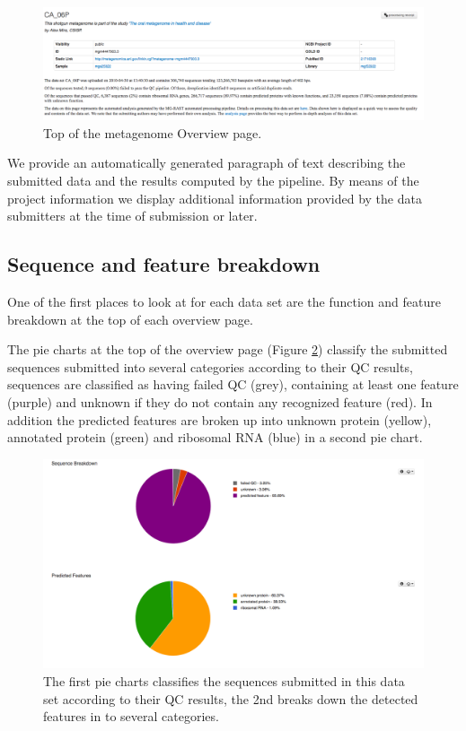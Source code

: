 \documentclass[12pt,fullpage]{report}
\begin{document}
\begin{figure}
\begin{center}
\includegraphics[width=7in]{Images/v4-metagenome-overview-page.png}
\end{center}
\caption{
Top of the metagenome Overview page.
}
\label{fig:metagenome-overview}
\end{figure}


We provide an automatically generated paragraph of text describing the submitted data and the results computed by the pipeline. By means of the project information we display additional information provided by the data submitters at the time of submission or later.

\subsection*{Sequence and feature breakdown}
One of the first places to look at for each data set are the function and feature breakdown at the top of each overview page.

The pie charts at the top of the overview page (Figure \ref{fig:classification-pie-chart}) classify the submitted sequences submitted into several categories according to their QC results, sequences are classified as having failed QC (grey), containing at least one feature (purple) and unknown if they do not contain any recognized feature (red).
In addition the predicted features are broken up into unknown protein (yellow), annotated protein (green) and ribosomal RNA (blue) in a second pie chart.


\begin{figure}
\begin{center}
\includegraphics[width=6in]{Images/v4-overviewpage-quality-pie-charts.png}
\end{center}
\caption{
The first pie charts classifies the sequences submitted in this data set according to their QC results, the 2nd breaks down the detected features in to several categories.
}
\label{fig:classification-pie-chart}
\end{figure}
\end{document}
